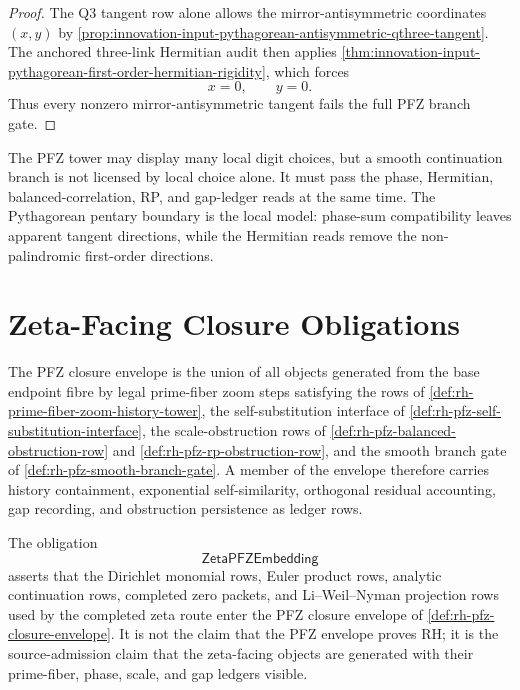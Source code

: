 \begin{proof}
The Q3 tangent row alone allows the mirror-antisymmetric coordinates
$(x,y)$ by
\autoref{prop:innovation-input-pythagorean-antisymmetric-qthree-tangent}.
The anchored three-link Hermitian audit then applies
\autoref{thm:innovation-input-pythagorean-first-order-hermitian-rigidity},
which forces
$$
x=0,
\qquad
y=0.
$$
Thus every nonzero mirror-antisymmetric tangent fails the full PFZ branch
gate.
\end{proof}

\begin{principle}
\label{prin:rh-pfz-branch-admissibility-multiprojection}
The PFZ tower may display many local digit choices, but a smooth
continuation branch is not licensed by local choice alone.  It must pass
the phase, Hermitian, balanced-correlation, RP, and gap-ledger reads at
the same time.  The Pythagorean pentary boundary is the local model:
phase-sum compatibility leaves apparent tangent directions, while the
Hermitian reads remove the non-palindromic first-order directions.
\end{principle}

\section{Zeta-Facing Closure Obligations}
\label{sec:rh-pfz-zeta-facing-closure-obligations}

\begin{definition}
\label{def:rh-pfz-closure-envelope}
The PFZ closure envelope is the union of all objects generated from the
base endpoint fibre by legal prime-fiber zoom steps satisfying the rows
of \autoref{def:rh-prime-fiber-zoom-history-tower}, the
self-substitution interface of
\autoref{def:rh-pfz-self-substitution-interface}, the scale-obstruction
rows of \autoref{def:rh-pfz-balanced-obstruction-row} and
\autoref{def:rh-pfz-rp-obstruction-row}, and the smooth branch gate of
\autoref{def:rh-pfz-smooth-branch-gate}.  A member of the envelope
therefore carries history containment, exponential self-similarity,
orthogonal residual accounting, gap recording, and obstruction
persistence as ledger rows.
\end{definition}

\begin{definition}[ZetaPFZEmbedding]
\label{def:rh-zeta-pfz-embedding}
The obligation
$$
\mathsf{ZetaPFZEmbedding}
$$
asserts that the Dirichlet monomial rows, Euler product rows, analytic
continuation rows, completed zero packets, and Li--Weil--Nyman
projection rows used by the completed zeta route enter the PFZ closure
envelope of \autoref{def:rh-pfz-closure-envelope}.  It is not the claim
that the PFZ envelope proves RH; it is the source-admission claim that
the zeta-facing objects are generated with their prime-fiber, phase,
scale, and gap ledgers visible.
\end{definition}

